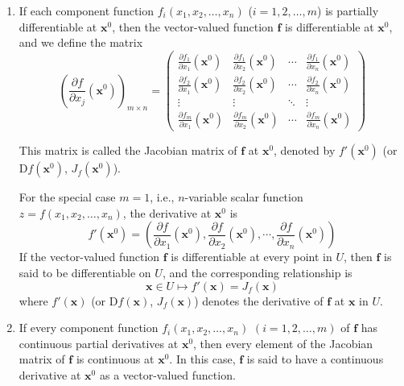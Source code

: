 \documentclass[11pt]{../../TexTemplate/elegantbook}
\begin{document}
\begin{enumerate}
    \item  If each component function $f_i(x_1, x_2, \dots, x_n)$ ($i=1,2,\dots,m$) is partially differentiable at $\mathbf{x}^0$, 
        then the vector-valued function $\mathbf{f}$ is differentiable at $\mathbf{x}^0$, and we define the matrix
        \[
            \left( \frac{\partial f}{\partial x_j} (\mathbf{x}^0) \right)_{m \times n}
            =
            \begin{pmatrix}
            \frac{\partial f_1}{\partial x_1}(\mathbf{x}^0) & \frac{\partial f_1}{\partial x_2}(\mathbf{x}^0) & \cdots & \frac{\partial f_1}{\partial x_n}(\mathbf{x}^0) \\
            \frac{\partial f_2}{\partial x_1}(\mathbf{x}^0) & \frac{\partial f_2}{\partial x_2}(\mathbf{x}^0) & \cdots & \frac{\partial f_2}{\partial x_n}(\mathbf{x}^0) \\
            \vdots & \vdots & \ddots & \vdots \\
            \frac{\partial f_m}{\partial x_1}(\mathbf{x}^0) & \frac{\partial f_m}{\partial x_2}(\mathbf{x}^0) & \cdots & \frac{\partial f_m}{\partial x_n}(\mathbf{x}^0)
            \end{pmatrix}
        \]

        This matrix is called the Jacobian matrix of $\mathbf{f}$ at $\mathbf{x}^0$, 
        denoted by $f'(\mathbf{x}^0)$ (or $\mathrm{D}f(\mathbf{x}^0)$, $J_f(\mathbf{x}^0)$).

        For the special case $m=1$, i.e., $n$-variable scalar function $z=f(x_1,x_2,\dots,x_n)$, 
        the derivative at $\mathbf{x}^0$ is
        \[
            f'(\mathbf{x}^0) = 
            \left( 
                \frac{\partial f}{\partial x_1}(\mathbf{x}^0), \frac{\partial f}{\partial x_2}(\mathbf{x}^0), 
                \cdots, \frac{\partial f}{\partial x_n}(\mathbf{x}^0) 
            \right)
        \]
        If the vector-valued function $\mathbf{f}$ is differentiable at every point in $U$, 
        then $\mathbf{f}$ is said to be differentiable on $U$, and the corresponding relationship is
        \[
        \mathbf{x} \in U \mapsto f'(\mathbf{x}) = J_f(\mathbf{x})
        \]
        where $f'(\mathbf{x})$ (or $\mathrm{D}f(\mathbf{x})$, $J_f(\mathbf{x})$) 
        denotes the derivative of $\mathbf{f}$ at $\mathbf{x}$ in $U$.
    \item  If every component function $f_i(x_1, x_2, \dots, x_n)$ $(i=1,2,\dots,m)$ of $\mathbf{f}$ 
        has continuous partial derivatives at $\mathbf{x}^0$, 
        then every element of the Jacobian matrix of $\mathbf{f}$ is continuous at $\mathbf{x}^0$. 
        In this case, $\mathbf{f}$ is said to have a continuous derivative at $\mathbf{x}^0$ as a vector-valued function.
        

\end{enumerate}
\end{document}

